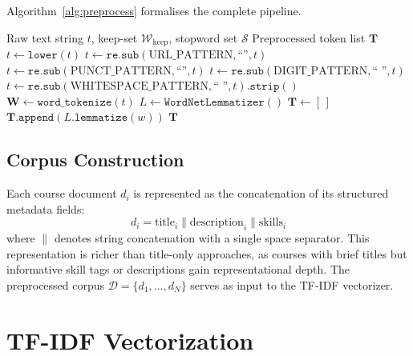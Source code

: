 \documentclass[12pt, a4paper]{article}
\begin{document}
Algorithm~\ref{alg:preprocess} formalises the complete pipeline.

\begin{algorithm}[htbp]
\caption{NLPRec Text Preprocessing Pipeline}
\label{alg:preprocess}
\begin{algorithmic}[1]
\Require Raw text string $t$, keep-set $\mathcal{W}_{\text{keep}}$, stopword set $\mathcal{S}$
\Ensure Preprocessed token list $\mathbf{T}$
\State $t \gets \texttt{lower}(t)$
\State $t \gets \texttt{re.sub}(\text{URL\_PATTERN}, \text{``''}, t)$
\State $t \gets \texttt{re.sub}(\text{PUNCT\_PATTERN}, \text{``''}, t)$
\State $t \gets \texttt{re.sub}(\text{DIGIT\_PATTERN}, \text{`` ''}, t)$
\State $t \gets \texttt{re.sub}(\text{WHITESPACE\_PATTERN}, \text{`` ''}, t).\texttt{strip}()$
\State $\mathbf{W} \gets \texttt{word\_tokenize}(t)$
\State $L \gets \texttt{WordNetLemmatizer}()$
\State $\mathbf{T} \gets [\,]$
        \State $\mathbf{T}.\texttt{append}(L.\texttt{lemmatize}(w))$
    \EndIf
\EndFor
\Return $\mathbf{T}$
\end{algorithmic}
\end{algorithm}

\subsection{Corpus Construction}

Each course document $d_i$ is represented as the concatenation of its structured metadata fields:
\begin{equation}
    d_i = \text{title}_i \mathbin{\|} \text{description}_i \mathbin{\|} \text{skills}_i
    \label{eq:corpus}
\end{equation}
where $\|$ denotes string concatenation with a single space separator. This representation is
richer than title-only approaches, as courses with brief titles but informative skill tags or
descriptions gain representational depth. The preprocessed corpus $\mathcal{D} = \{d_1, \ldots,
d_N\}$ serves as input to the TF-IDF vectorizer.

\section{TF-IDF Vectorization}
\label{sec:vectorization}
\end{document}
